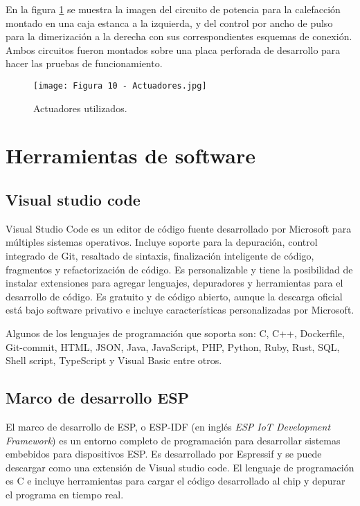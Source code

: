 En la figura \ref{fig:10} se muestra la imagen del circuito de potencia para la calefacción montado en una caja estanca a la izquierda, y del control por ancho de pulso para la dimerización a la derecha con sus correspondientes esquemas de conexión. Ambos circuitos fueron montados sobre una placa perforada de desarrollo para hacer las pruebas de funcionamiento.

\newpage
\begin{figure}[h]
\centering
\texttt{[image: Figura 10 - Actuadores.jpg]}
\caption[Actuadores utilizados]{Actuadores utilizados.}
\label{fig:10}
\end{figure}

\section{Herramientas de software}

\subsection{Visual studio code \citep{21}}

Visual Studio Code es un editor de código fuente desarrollado por Microsoft para múltiples sistemas operativos. Incluye soporte para la depuración, control integrado de Git, resaltado de sintaxis, finalización inteligente de código, fragmentos y refactorización de código. Es personalizable y tiene la posibilidad de instalar extensiones para agregar lenguajes, depuradores y herramientas para el desarrollo de código. Es gratuito y de código abierto, aunque la descarga oficial está bajo software privativo e incluye características personalizadas por Microsoft.

Algunos de los lenguajes de programación que soporta son: C, C++, Dockerfile, Git-commit, HTML, JSON, Java, JavaScript, PHP, Python, Ruby, Rust, SQL, Shell script, TypeScript y Visual Basic entre otros.

\subsection{Marco de desarrollo ESP}

El marco de desarrollo de ESP, o ESP-IDF (en inglés \textit{ESP IoT Development Framework}) es un entorno completo de programación para desarrollar sistemas embebidos para dispositivos ESP. Es desarrollado por Espressif y se puede descargar como una extensión de Visual studio code. El lenguaje de programación es C e incluye herramientas para cargar el código desarrollado al chip y depurar el programa en tiempo real.

